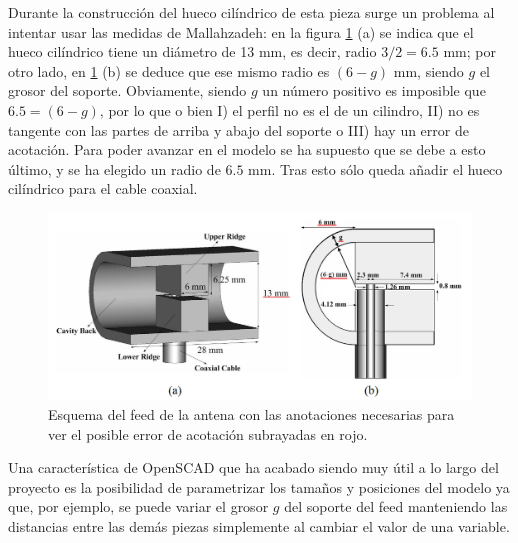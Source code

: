 \documentclass[11pt,a4paper,twoside,pdf]{article}
\numberwithin{equation}{section}
\begin{document}
Durante la construcción del hueco cilíndrico de esta pieza surge un problema al intentar usar las medidas de Mallahzadeh: en la figura \ref{fig:esquemaFeed} (a) se indica que el hueco cilíndrico tiene un diámetro de 13 mm, es decir, radio $3/2=6.5$ mm; por otro lado, en \ref{fig:esquemaFeed} (b) se deduce que ese mismo radio es $(6-g)$ mm, siendo $g$ el grosor del soporte. Obviamente, siendo $g$ un número positivo es imposible que $6.5 = (6-g)$, por lo que o bien I) el perfil no es el de un cilindro, II) no es tangente con las partes de arriba y abajo del soporte o III) hay un error de acotación. Para poder avanzar en el modelo se ha supuesto que se debe a esto último, y se ha elegido un radio de $6.5$ mm. Tras esto sólo queda añadir el hueco cilíndrico para el cable coaxial.
\begin{figure}[!h]
    \centering
    \includegraphics[width=0.9\linewidth]{img/modelos/SoporteFeed/feedEsquema.png}
    \caption{Esquema del feed de la antena \cite{tem_horn} con las anotaciones necesarias para ver el posible error de acotación subrayadas en rojo.}
    \label{fig:esquemaFeed}
\end{figure}

Una característica de OpenSCAD que ha acabado siendo muy útil a lo largo del proyecto es la posibilidad de parametrizar los tamaños y posiciones del modelo ya que, por ejemplo, se puede variar el grosor $g$ del soporte del feed manteniendo las distancias entre las demás piezas simplemente al cambiar el valor de una variable.\\

\end{document}
